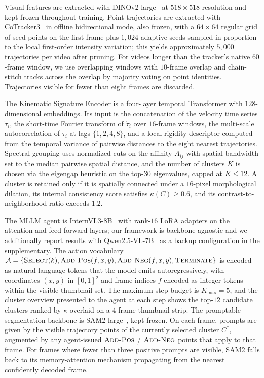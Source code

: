 \documentclass[11pt]{article}
\begin{document}
Visual features are extracted with DINOv2-large~\cite{dinov2} at $518\times518$ resolution and kept frozen throughout training.
Point trajectories are extracted with CoTracker3~\cite{cotracker3} in offline bidirectional mode, also frozen, with a $64\times64$ regular grid of seed points on the first frame plus $1{,}024$ adaptive seeds sampled in proportion to the local first-order intensity variation; this yields approximately $5{,}000$ trajectories per video after pruning.
For videos longer than the tracker's native $60$-frame window, we use overlapping windows with $10$-frame overlap and chain-stitch tracks across the overlap by majority voting on point identities.
Trajectories visible for fewer than eight frames are discarded.

The Kinematic Signature Encoder is a four-layer temporal Transformer with $128$-dimensional embeddings.
Its input is the concatenation of the velocity time series $\dot{\tau}_i$, the short-time Fourier transform of $\dot{\tau}_i$ over $16$-frame windows, the multi-scale autocorrelation of $\dot{\tau}_i$ at lags $\{1,2,4,8\}$, and a local rigidity descriptor computed from the temporal variance of pairwise distances to the eight nearest trajectories.
Spectral grouping uses normalized cuts on the affinity $A_{ij}$ with spatial bandwidth set to the median pairwise spatial distance, and the number of clusters $K$ is chosen via the eigengap heuristic on the top-$30$ eigenvalues, capped at $K\leq12$.
A cluster is retained only if it is spatially connected under a $16$-pixel morphological dilation, its internal consistency score satisfies $\kappa(C)\geq 0.6$, and its contrast-to-neighborhood ratio exceeds $1.2$.

The MLLM agent is InternVL3-8B~\cite{internvl3} with rank-$16$ LoRA adapters on the attention and feed-forward layers; our framework is backbone-agnostic and we additionally report results with Qwen2.5-VL-7B~\cite{qwenvl} as a backup configuration in the supplementary.
The action vocabulary $\mathcal{A}=\{\textsc{Select}(k),\textsc{Add-Pos}(f,x,y),\textsc{Add-Neg}(f,x,y),\textsc{Terminate}\}$ is encoded as natural-language tokens that the model emits autoregressively, with coordinates $(x,y)$ in $[0,1]^2$ and frame indices $f$ encoded as integer tokens within the visible thumbnail set.
The maximum step budget is $K_{\max}=5$, and the cluster overview presented to the agent at each step shows the top-$12$ candidate clusters ranked by $\kappa$ overlaid on a $4$-frame thumbnail strip.
The promptable segmentation backbone is SAM2-large~\cite{sam2}, kept frozen.
On each frame, prompts are given by the visible trajectory points of the currently selected cluster $C^*$, augmented by any agent-issued $\textsc{Add-Pos}$ / $\textsc{Add-Neg}$ points that apply to that frame.
For frames where fewer than three positive prompts are visible, SAM2 falls back to its memory-attention mechanism propagating from the nearest confidently decoded frame.
\end{document}
